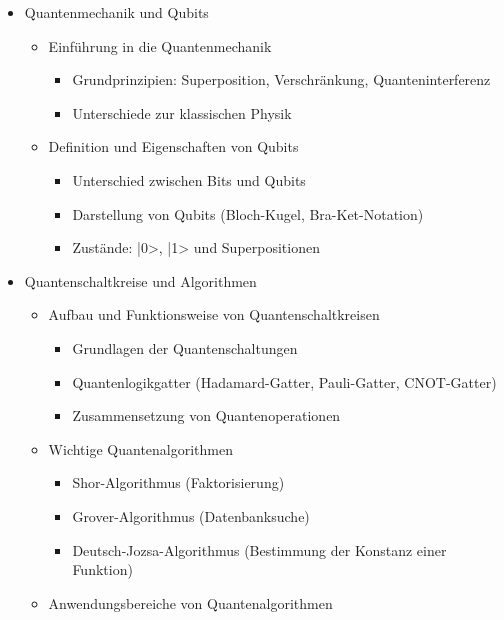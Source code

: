 \begin{itemize}
    \item Quantenmechanik und Qubits
        \begin{itemize}
            \item Einführung in die Quantenmechanik
                \begin{itemize}
                    \item Grundprinzipien: Superposition, Verschränkung, Quanteninterferenz
                    \item Unterschiede zur klassischen Physik
                \end{itemize}
            \item Definition und Eigenschaften von Qubits
                \begin{itemize}
                    \item Unterschied zwischen Bits und Qubits
                    \item Darstellung von Qubits (Bloch-Kugel, Bra-Ket-Notation)
                    \item Zustände: |0>, |1> und Superpositionen
                \end{itemize}
        \end{itemize}
    \item Quantenschaltkreise und Algorithmen
        \begin{itemize}
            \item Aufbau und Funktionsweise von Quantenschaltkreisen
                \begin{itemize}
                    \item Grundlagen der Quantenschaltungen
                    \item Quantenlogikgatter (Hadamard-Gatter, Pauli-Gatter, CNOT-Gatter)
                    \item Zusammensetzung von Quantenoperationen
                \end{itemize}
            \item Wichtige Quantenalgorithmen
                \begin{itemize}
                    \item Shor-Algorithmus (Faktorisierung)
                    \item Grover-Algorithmus (Datenbanksuche)
                    \item Deutsch-Jozsa-Algorithmus (Bestimmung der Konstanz einer Funktion)
                \end{itemize}
            \item Anwendungsbereiche von Quantenalgorithmen

\end{itemize}
\end{itemize}
